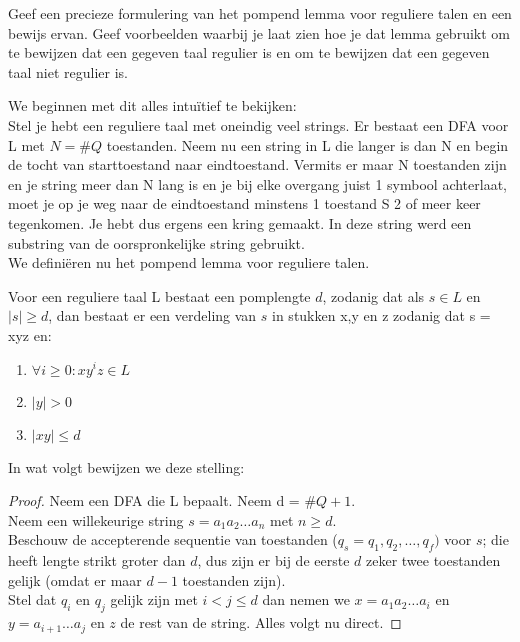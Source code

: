 \begin{quest}[Vraag 4]
Geef een precieze formulering van het pompend lemma voor reguliere talen en een bewijs ervan. Geef voorbeelden waarbij je laat zien hoe je dat lemma gebruikt om te bewijzen dat een gegeven taal regulier is en om te bewijzen dat een gegeven taal niet regulier is.
\end{quest}

We beginnen met dit alles intu\"itief te bekijken:\\
Stel je hebt een reguliere taal met oneindig veel strings. Er bestaat een DFA voor L met $N = \#Q$ toestanden. Neem nu een string in L die langer is dan N en begin de tocht van starttoestand naar eindtoestand. Vermits er maar N toestanden zijn en je string meer dan N lang is en je bij elke overgang juist 1 symbool achterlaat, moet je op je weg naar de eindtoestand minstens 1 toestand S 2 of meer keer tegenkomen. Je hebt dus ergens een kring gemaakt. In deze string werd een substring van de oorspronkelijke string gebruikt.\\
We defini\"eren nu het pompend lemma voor reguliere talen.

\begin{theorem}
Voor een reguliere taal L bestaat een pomplengte $d$, zodanig dat als $s \in L$ en $|s| \geq d$, dan bestaat er een verdeling van $s$ in stukken x,y en z zodanig dat s = xyz en:
\begin{enumerate}
\item $\forall i \geq 0 : xy^iz \in L$
\item $|y| > 0$
\item $|xy| \leq d$
\end{enumerate}
\end{theorem}

In wat volgt bewijzen we deze stelling:

\begin{proof}
Neem een DFA die L bepaalt. Neem d = $\#Q+1$.\\
Neem een willekeurige string $s = a_1a_2 \hdots a_n$ met $n \geq d$. \\
Beschouw de accepterende sequentie van toestanden ($q_s = q_1,q_2,\hdots,q_f)$ voor $s$; die heeft lengte strikt groter dan $d$, dus zijn er bij de eerste $d$ zeker twee toestanden gelijk (omdat er maar $d-1$ toestanden zijn).\\
Stel dat $q_i$ en $q_j$ gelijk zijn met $i<j \leq d$ dan nemen we $x=a_1a_2\hdots a_i$ en $y=a_{i+1} \hdots a_j$ en $z$ de rest van de string. Alles volgt nu direct.
\end{proof}

